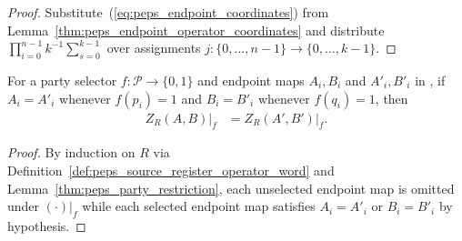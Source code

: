 \begin{proof}\leanok
    Substitute~(\ref{eq:peps_endpoint_coordinates}) from
    Lemma~\ref{thm:peps_endpoint_operator_coordinates} and distribute
    $\prod_{i=0}^{n-1}k^{-1}\sum_{s=0}^{k-1}$ over assignments
    $j:\{0,\ldots,n-1\}\to\{0,\ldots,k-1\}$.
\end{proof}

\begin{lemma}
    \label{thm:peps_source_register_operator_local_congruence}
    \leanok
    For a party selector $f:\mathcal P\to\{0,1\}$ and endpoint maps $A_i,B_i$
    and $A'_i,B'_i$ in \cite[proof of Theorem~5.2]{OpenAI2026PolynomialPEPS}, if
    $A_i=A'_i$ whenever $f(p_i)=1$ and $B_i=B'_i$ whenever $f(q_i)=1$, then
    \begin{align}
        Z_R(A,B)|_f & =Z_R(A',B')|_f.
        \label{eq:peps_source_register_operator_local_congruence}
    \end{align}
\end{lemma}

\begin{proof}\leanok
    By induction on $R$ via Definition~\ref{def:peps_source_register_operator_word}
    and Lemma~\ref{thm:peps_party_restriction}, each unselected endpoint map is
    omitted under $(\cdot)|_f$ while each selected endpoint map satisfies
    $A_i=A'_i$ or $B_i=B'_i$ by hypothesis.
\end{proof}


